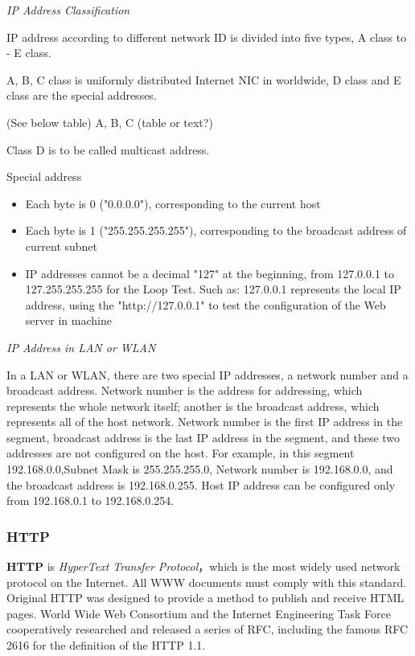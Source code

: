 \textit{IP Address Classification}

IP address according to different network ID is divided into five types, A class to - E class.  

A, B, C class is uniformly distributed Internet NIC in worldwide, D class and E class are the special addresses.  

(See below table) A, B, C (table or text?)

Class D is to be called multicast address.
  
Special address

\begin{itemize}
	\item Each byte is 0 ("0.0.0.0"), corresponding to the current host
	\item Each byte is 1 ("255.255.255.255"), corresponding to the broadcast address of current subnet
	\item IP addresses cannot be a decimal "127" at the beginning, from 127.0.0.1 to 127.255.255.255 for the Loop Test. Such as: 127.0.0.1 represents the local IP address, using the "http://127.0.0.1" to test the configuration of the Web server in machine
\end{itemize}

\textit{IP Address in LAN or WLAN}

In a LAN or WLAN, there are two special IP addresses, a network number and a broadcast address. Network number is the address for addressing, which represents the whole network itself; another is the broadcast address, which represents all of the host network. Network number is the first IP address in the segment, broadcast address is the last IP address in the segment, and these two addresses are not configured on the host. For example, in this segment 192.168.0.0,Subnet Mask is 255.255.255.0, Network number is 192.168.0.0, and the broadcast address is 192.168.0.255. Host IP address can be configured only from 192.168.0.1 to 192.168.0.254.  

\subsubsection{HTTP}

\textbf{HTTP} is \textit{HyperText Transfer Protocol}，which is the most widely used network protocol on the Internet. All WWW documents must comply with this standard. Original HTTP was designed to provide a method to publish and receive HTML pages. World Wide Web Consortium and the Internet Engineering Task Force cooperatively researched and released a series of RFC, including the famous RFC 2616 for the definition of the HTTP 1.1.   

